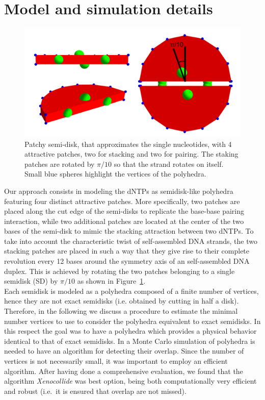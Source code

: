 \documentclass[aip,jcp, amsmath, amssymb, reprint]{revtex4-1}
\begin{document}
\section{\label{sec:level1}Model and simulation details}
\begin{figure}[h!]
\includegraphics[width=1\linewidth]{rota.png}
\caption{\label{fig:rota} Patchy semi-disk, that approximates the single nucleotides, with 4 attractive patches, two for stacking and two for pairing. The staking patches are rotated by $\pi/10$ so that the strand rotates on itself. Small blue
 spheres highlight the vertices of the polyhedra.}
\end{figure}
Our approach consists in modeling the dNTPs as semidisk-like polyhedra 
featuring four distinct attractive patches. More specifically, two patches are placed along the cut
edge of the semi-disks to replicate the base-base pairing interaction, while two additional patches are located
at the center of the two bases of the semi-disk to mimic the stacking attraction between two dNTPs. 
To take into account the characteristic twist
of self-assembled DNA strands, the two stacking patches are 
placed in such a way that they give rise to their complete revolution
every 12 bases around the symmetry axis of an self-assembled DNA duplex. 
This is achieved by rotating the two patches belonging to a single semidisk (SD) by $\pi/10$ 
as shown in Figure~\ref{fig:rota}. 
\\

Each semidisk is modeled as a polyhedra composed of a finite number of vertices, hence they are not exact semidisks (i.e. 
obtained by cutting in half a disk). Therefore, in the following we discuss a procedure to estimate the minimal number 
vertices to use to consider the polyhedra equivalent to exact semidisks. In this respect the goal was to have a polyhedra
which provides a physical behavior identical to that of exact semidisks. In a Monte Carlo simulation of polyhedra is needed
to have an algorithm for detecting their overlap. Since the number of vertices is not necessarily small, 
it was important to employ an efficient algorithm. After having done a comprehensive
evaluation, we found that the algorithm {\it Xenocollide}\cite{libccd} was best option, being both computationally very efficient 
and robust (i.e.~it is ensured that overlap are not missed).\\
\end{document}

